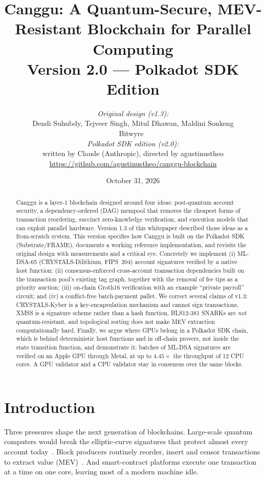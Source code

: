 \documentclass[11pt]{article}
\title{\textbf{Canggu}: A Quantum-Secure, MEV-Resistant Blockchain for Parallel Computing\\[4pt]
\large Version 2.0 --- Polkadot SDK Edition}
\author{\textit{Original design (v1.3):}\\ Dendi Suhubdy, Tejveer Singh, Mitul Dhawan, Maldini Sonkeng\\
\small Bitwyre~\cite{canggu-v13}\\[6pt]
\textit{Polkadot SDK edition (v2.0):}\\ written by Claude (Anthropic), directed by agustinustheo\\
\small \url{https://github.com/agustinustheo/canggu-blockchain}}
\date{October 31, 2026}
\theoremstyle{definition}
\theoremstyle{remark}
\begin{document}
\maketitle

\begin{abstract}
\noindent
Canggu is a layer-1 blockchain designed around four ideas: post-quantum account security, a
dependency-ordered (DAG) mempool that removes the cheapest forms of transaction reordering,
succinct zero-knowledge verification, and execution models that can exploit parallel hardware.
Version 1.3 of this whitepaper described those ideas as a from-scratch system. This version
specifies how Canggu is built on the Polkadot SDK (Substrate/FRAME), documents a working
reference implementation, and revisits the original design with measurements and a critical eye.
Concretely we implement (i) ML-DSA-65 (CRYSTALS-Dilithium, FIPS~204) account signatures verified
by a native host function; (ii) consensus-enforced cross-account transaction dependencies built on
the transaction pool's existing tag graph, together with the removal of fee tips as a priority
auction; (iii) on-chain Groth16 verification with an example ``private payroll'' circuit; and
(iv) a conflict-free batch-payment pallet. We correct several claims of v1.3: CRYSTALS-Kyber is a
key-encapsulation mechanism and cannot sign transactions, XMSS is a signature scheme rather than a
hash function, BLS12-381 SNARKs are \emph{not} quantum-resistant, and topological sorting does not
make MEV extraction computationally hard. Finally, we argue where GPUs belong in a Polkadot SDK
chain, which is behind deterministic host functions and in off-chain provers, not inside the state
transition function, and demonstrate it: batches of ML-DSA signatures are verified on an Apple
GPU through Metal, at up to $4.45\times$ the throughput of 12 CPU cores. A GPU validator and a
CPU validator stay in consensus over the same blocks.
\end{abstract}

\tableofcontents
\newpage

\section{Introduction}

Three pressures shape the next generation of blockchains. Large-scale quantum computers would break
the elliptic-curve signatures that protect almost every account today~\cite{shor1994,roetteler2017}.
Block producers routinely reorder, insert and censor transactions to extract value
(MEV)~\cite{flashboys}. And smart-contract platforms execute one transaction at a time on one core,
leaving most of a modern machine idle.
\end{document}
